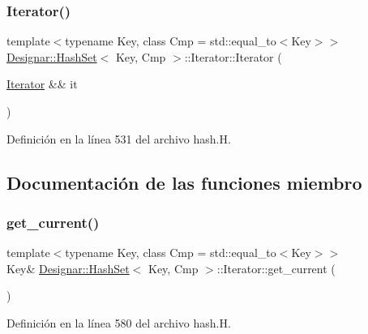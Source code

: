 \subsubsection{\texorpdfstring{Iterator()}{Iterator()}\hspace{0.1cm}{\footnotesize\ttfamily [5/5]}}
{\footnotesize\ttfamily template$<$typename Key, class Cmp = std\+::equal\+\_\+to$<$\+Key$>$$>$ \\
\hyperlink{class_designar_1_1_hash_set}{Designar\+::\+Hash\+Set}$<$ Key, Cmp $>$\+::Iterator\+::\+Iterator (\begin{DoxyParamCaption}\item[{\hyperlink{class_designar_1_1_hash_set_1_1_iterator}{Iterator} \&\&}]{it }\end{DoxyParamCaption})\hspace{0.3cm}{\ttfamily [inline]}}



Definición en la línea 531 del archivo hash.\+H.



\subsection{Documentación de las funciones miembro}
\mbox{\label{class_designar_1_1_hash_set_1_1_iterator_af954a7cf3f23fecf898b86030e808224}} 
\subsubsection{\texorpdfstring{get\+\_\+current()}{get\_current()}\hspace{0.1cm}{\footnotesize\ttfamily [1/2]}}
{\footnotesize\ttfamily template$<$typename Key, class Cmp = std\+::equal\+\_\+to$<$\+Key$>$$>$ \\
Key\& \hyperlink{class_designar_1_1_hash_set}{Designar\+::\+Hash\+Set}$<$ Key, Cmp $>$\+::Iterator\+::get\+\_\+current (\begin{DoxyParamCaption}{ }\end{DoxyParamCaption})\hspace{0.3cm}{\ttfamily [inline]}}



Definición en la línea 580 del archivo hash.\+H.

